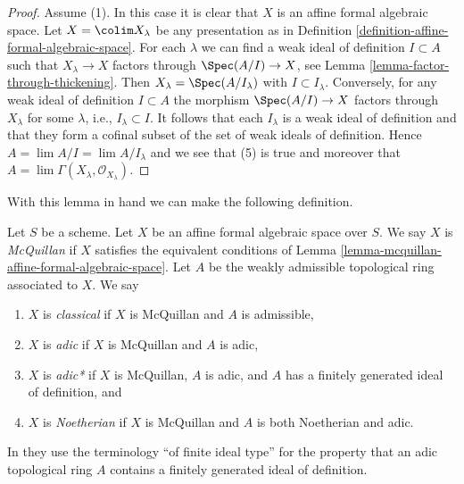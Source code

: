 \begin{proof}
\medskip\noindent
Assume (1). In this case it is clear that $X$ is an affine formal
algebraic space. Let $X = \colim X_\lambda$ be any presentation as in
Definition \ref{definition-affine-formal-algebraic-space}.
For each $\lambda$ we can find a weak ideal of definition
$I \subset A$ such that $X_\lambda \to X$ factors through
$\Spec(A/I) \to X$, see Lemma \ref{lemma-factor-through-thickening}.
Then $X_\lambda = \Spec(A/I_\lambda)$ with $I \subset I_\lambda$.
Conversely, for any weak ideal of definition $I \subset A$
the morphism $\Spec(A/I) \to X$ factors through $X_\lambda$
for some $\lambda$, i.e., $I_\lambda \subset I$.
It follows that each $I_\lambda$ is a weak ideal of definition
and that they form a cofinal subset of the set of weak ideals
of definition. Hence $A = \lim A/I = \lim A/I_\lambda$
and we see that (5) is true and moreover that
$A = \lim \Gamma(X_\lambda, \mathcal{O}_{X_\lambda})$.
\end{proof}

\noindent
With this lemma in hand we can make the following definition.

\begin{definition}
\label{definition-types-affine-formal-algebraic-space}
Let $S$ be a scheme. Let $X$ be an affine formal algebraic space over $S$.
We say $X$ is {\it McQuillan} if $X$ satisfies the equivalent conditions
of Lemma \ref{lemma-mcquillan-affine-formal-algebraic-space}. Let $A$
be the weakly admissible topological ring associated to $X$. We say
\begin{enumerate}
\item $X$ is {\it classical} if $X$ is McQuillan and $A$ is admissible,
\item $X$ is {\it adic} if $X$ is McQuillan and $A$ is adic,
\item $X$ is {\it adic*} if $X$ is McQuillan, $A$ is adic, and $A$
has a finitely generated ideal of definition, and
\item $X$ is {\it Noetherian} if $X$ is McQuillan and $A$ is
both Noetherian and adic.
\end{enumerate}
\end{definition}

\noindent
In \cite{Fujiwara-Kato} they use the terminology ``of finite ideal type''
for the property that an adic topological ring $A$ contains a finitely
generated ideal of definition.

